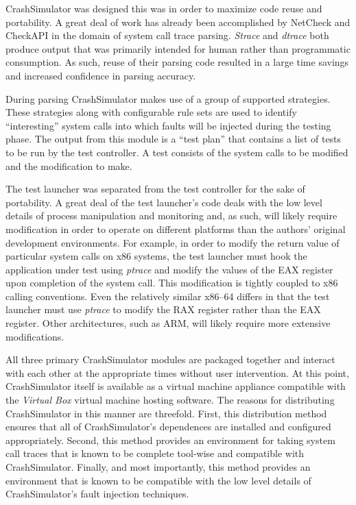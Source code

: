        CrashSimulator was designed this was in order to maximize code reuse and portability. A great deal of work has
        already been accomplished by NetCheck and CheckAPI in the domain of system call trace parsing. \emph{Strace} and
        \emph{dtrace} both produce output that was primarily intended for human rather than programmatic consumption. As
        such, reuse of their parsing code resulted in a large time savings and increased confidence in parsing accuracy.

        During parsing CrashSimulator makes use of a group of supported strategies. These strategies along with
        configurable rule sets are used to identify ``interesting'' system calls into which faults will be injected
        during the testing phase. The output from this module is a ``test plan'' that contains a list of tests to be run
        by the test controller. A test consists of the system calls to be modified and the modification to make.

        The test launcher was separated from the test controller for the sake of portability. A great deal of the test
        launcher's code deals with the low level details of process manipulation and monitoring and, as such, will
        likely require modification in order to operate on different platforms than the authors' original development
        environments. For example, in order to modify the return value of particular system calls on x86 systems, the
        test launcher must hook the application under test using \emph{ptrace} and modify the values of the EAX register
        upon completion of the system call. This modification is tightly coupled to x86 calling conventions. Even the
        relatively similar x86--64 differs in that the test launcher must use \emph{ptrace} to modify the RAX register
        rather than the EAX register. Other architectures, such as ARM, will likely require more extensive
        modifications.

        All three primary CrashSimulator modules are packaged together and interact with each other at the appropriate
        times without user intervention. At this point, CrashSimulator itself is available as a virtual machine
        appliance compatible with the \emph{Virtual Box} virtual machine hosting software. The reasons for distributing
        CrashSimulator in this manner are threefold. First, this distribution method ensures that all of
        CrashSimulator's dependences are installed and configured appropriately. Second, this method provides an
        environment for taking system call traces that is known to be complete tool-wise and compatible with
        CrashSimulator. Finally, and most importantly, this method provides an environment that is known to be
        compatible with the low level details of CrashSimulator's fault injection techniques.

